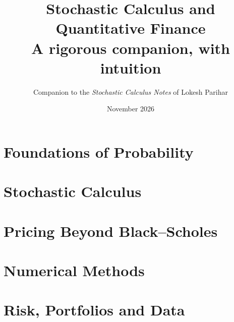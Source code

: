 \documentclass[11pt,a4paper,openany]{book}
\title{\Huge\bfseries Stochastic Calculus and\\[4pt] Quantitative Finance\\[14pt]
\Large\mdseries A rigorous companion, with intuition}
\author{Companion to the \emph{Stochastic Calculus Notes} of Lokesh Parihar}
\date{November 2026}
\begin{document}
\frontmatter
\maketitle
\tableofcontents


\mainmatter
\part{Foundations of Probability}



\part{Stochastic Calculus}






\part{Pricing Beyond Black--Scholes}





\part{Numerical Methods}



\part{Risk, Portfolios and Data}





\backmatter

\end{document}
